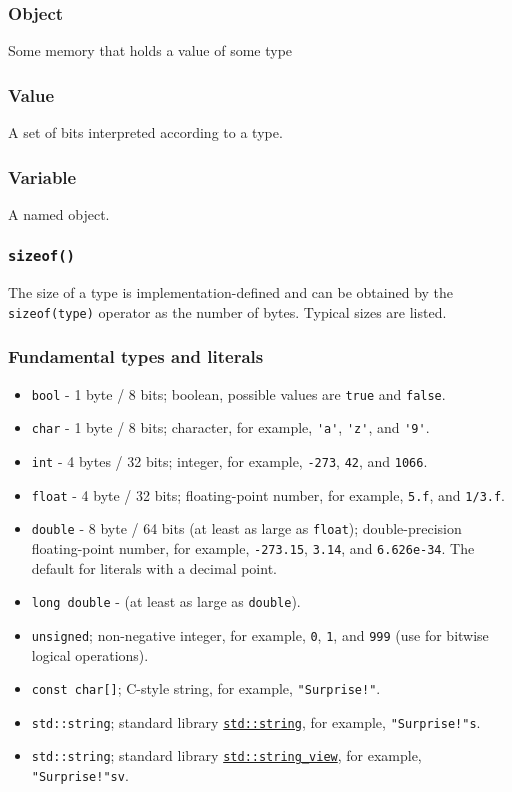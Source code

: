 \documentclass[8pt, table, xcdraw]{article}%
\begin{document}
\subsubsection{Object}
Some memory that holds a value of some type

\subsubsection{Value}
A set of bits interpreted according to a type.

\subsubsection{Variable}
A named object.

\subsubsection{\lstinline{sizeof()}}
The size of a type is implementation-defined and can be obtained by the \lstinline{sizeof(type)} operator as the number of bytes. Typical sizes are listed.

\subsubsection{Fundamental types and literals}

\begin{itemize}[leftmargin=15pt,noitemsep,nolistsep]
\item \lstinline{bool} - 1 byte / 8 bits; boolean, possible values are \lstinline{true} and \lstinline{false}.
\item \lstinline{char} - 1 byte / 8 bits; character, for example, \lstinline{'a'}, \lstinline{'z'}, and \lstinline{'9'}.
\item \lstinline{int} - 4 bytes / 32 bits; integer, for example, \lstinline{-273}, \lstinline{42}, and \lstinline{1066}.
\item \lstinline{float} - 4 byte / 32 bits; floating-point number, for example, \lstinline{5.f}, and \lstinline{1/3.f}.
\item \lstinline{double} - 8 byte / 64 bits (at least as large as \lstinline{float}); double-precision floating-point number, for example, \lstinline{-273.15}, \lstinline{3.14}, and \lstinline{6.626e-34}. The default for literals with a decimal point.
\item \lstinline{long double} - (at least as large as \lstinline{double}).
\item \lstinline{unsigned}; non-negative integer, for example, \lstinline{0}, \lstinline{1}, and \lstinline{999} (use for bitwise logical operations).
\item \lstinline{const char[]}; C-style string, for example, \lstinline{"Surprise!"}.
\item \lstinline{std::string}; standard library \hyperref[string]{\lstinline{std::string}}, for example, \lstinline{"Surprise!"s}.
\item \lstinline{std::string}; standard library \hyperref[string_view]{\lstinline{std::string_view}}, for example, \lstinline{"Surprise!"sv}.
\end{itemize}
\end{document}
